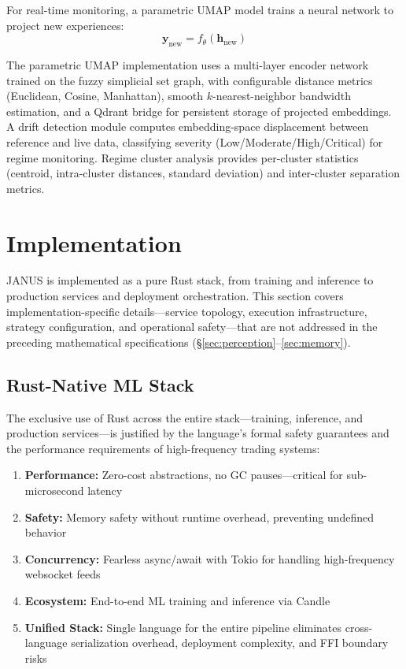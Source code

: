 \documentclass[12pt, a4paper]{article}
\begin{document}
For real-time monitoring, a parametric UMAP model trains a neural network to project new experiences:
\begin{equation}
	\mathbf{y}_{\text{new}} = f_\theta(\mathbf{h}_{\text{new}})
\end{equation}

The parametric UMAP implementation uses a multi-layer encoder network trained on the fuzzy simplicial set graph, with configurable distance metrics (Euclidean, Cosine, Manhattan), smooth $k$-nearest-neighbor bandwidth estimation, and a Qdrant bridge for persistent storage of projected embeddings. A drift detection module computes embedding-space displacement between reference and live data, classifying severity (Low/Moderate/High/Critical) for regime monitoring. Regime cluster analysis provides per-cluster statistics (centroid, intra-cluster distances, standard deviation) and inter-cluster separation metrics.


\section{Implementation}
\label{sec:implementation}

JANUS is implemented as a pure Rust stack, from training and inference to production services and deployment orchestration. This section covers implementation-specific details---service topology, execution infrastructure, strategy configuration, and operational safety---that are not addressed in the preceding mathematical specifications (\S\ref{sec:perception}--\ref{sec:memory}).

\subsection{Rust-Native ML Stack}
\label{sec:rust_stack}

The exclusive use of Rust across the entire stack---training, inference, and production services---is justified by the language's formal safety guarantees \citep{matsakis2014rust, jung2018rustbelt} and the performance requirements of high-frequency trading systems:

\begin{enumerate}
	\item \textbf{Performance:} Zero-cost abstractions, no GC pauses---critical for sub-microsecond latency
	\item \textbf{Safety:} Memory safety without runtime overhead, preventing undefined behavior
	\item \textbf{Concurrency:} Fearless async/await with Tokio \citep{tokio2024} for handling high-frequency websocket feeds
	\item \textbf{Ecosystem:} End-to-end ML training and inference via Candle \citep{candle2024}
	\item \textbf{Unified Stack:} Single language for the entire pipeline eliminates cross-language serialization overhead, deployment complexity, and FFI boundary risks
\end{enumerate}
\end{document}

